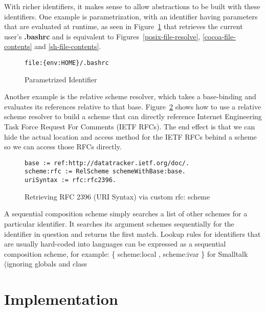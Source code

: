 \documentclass[preprint,authoryear]{acm_proc_article-sp}
\begin{document}
With richer identifiers, it makes sense to allow abstractions to be built with these identifiers.
One example is parametrization, with an identifier having parameters that are evaluated
at runtime, as seen in Figure~\ref{bashrc-pi} that retrieves the current user's {\bf .bashrc} 
and is equivalent to Figures~\ref{posix-file-resolve}, \ref{cocoa-file-contents} and 
\ref{sh-file-contents}.

\begin{figure}[htbp]
\begin{center}
\begin{verbatim}
file:{env:HOME}/.bashrc
\end{verbatim}
\caption{Parametrized Identifier}
\label{bashrc-pi}
\end{center}
\end{figure}

Another example is the relative scheme resolver, which takes a base-binding
and evaluates its references relative to that base.  Figure~\ref{rfc-scheme} shows
how to use a relative scheme resolver to build a scheme that can directly
reference Internet Engineering Task Force Request For Comments (IETF RFCs).
The end effect is that we can hide the actual location and access method for
the IETF RFCs behind a scheme so we can access those RFCs directly.

\begin{figure}[htbp]
\begin{center}
\begin{verbatim}
base := ref:http://datatracker.ietf.org/doc/.
scheme:rfc := RelScheme schemeWithBase:base.
uriSyntax := rfc:rfc2396.
\end{verbatim}
\caption{Retrieving RFC 2396 (URI Syntax) via custom rfc: scheme}
\label{rfc-scheme}
\end{center}
\end{figure}

A sequential composition scheme simply searches a list of other schemes
for a particular identifier.  It searches its argument schemes sequentially
for the identifier in question and returns the first match.  Lookup rules for
identifiers that are usually hard-coded into languages can be expressed
as a sequential composition scheme, for example:   \{ scheme:local ,
scheme:ivar \} for Smalltalk (ignoring globals and class



\section{Implementation}
\end{document}
